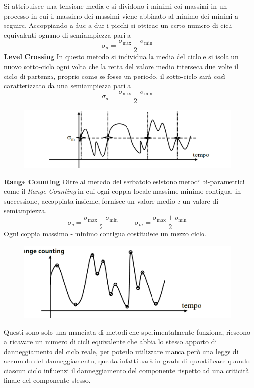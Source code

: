 		  
		  Si attribuisce una tensione media e si dividono i minimi coi massimi in un processo in cui il massimo dei massimi viene abbinato al minimo dei minimi a seguire.
		  Accoppiando a due a due i picchi si ottiene un certo numero di cicli equivalenti ognuno di semiampiezza pari a
		  \[\sigma_a = \dfrac{\sigma_{\max}-\sigma_{\min}}{2}\]
\newpage		  
		  \textbf{Level Crossing}\newline
		  In questo metodo si individua la media del ciclo e si isola un nuovo sotto-ciclo ogni volta che la retta del valore medio interseca due volte il ciclo di partenza, proprio come se fosse un periodo, il sotto-ciclo sarà così caratterizzato da una semiampiezza pari a
		  \[\sigma_a = \dfrac{\sigma_{\max}-\sigma_{\min}}{2}\]
		  \begin{figure}[H]
		  	\centering
		  	\includegraphics[width=0.5\linewidth]{immagini_10/screenshot016}
		  	\label{fig:screenshot016}
		  \end{figure}
		  
		  
		  \textbf{Range Counting}\newline
		  Oltre al metodo del serbatoio esistono metodi bi-parametrici come il \textit{Range Counting} in cui ogni coppia locale massimo-minimo contigua, in successione, accoppiata insieme, fornisce un valore medio e un valore di semiampiezza. 
		  \[\sigma_a = \dfrac{\sigma_{\max}-\sigma_{\min}}{2}\hspace{1cm} \sigma_m = \dfrac{\sigma_{\max}+\sigma_{\min}}{2}\]
		  Ogni coppia massimo - minimo contigua costituisce un mezzo ciclo. 
		  \begin{figure}[H]
		  	\centering
		  	\includegraphics[width=0.5\linewidth]{immagini_10/screenshot019}
		  	\label{fig:screenshot019}
		  \end{figure}
		  
		  Questi sono solo una manciata di metodi che sperimentalmente funziona, riescono a ricavare un numero di cicli equivalente che abbia lo stesso apporto di danneggiamento del ciclo reale, per poterlo utilizzare manca però una legge di accumulo del danneggiamento, questa infatti sarà in grado di quantificare quando ciascun ciclo influenzi il danneggiamento del componente rispetto ad una criticità finale del componente stesso. 
